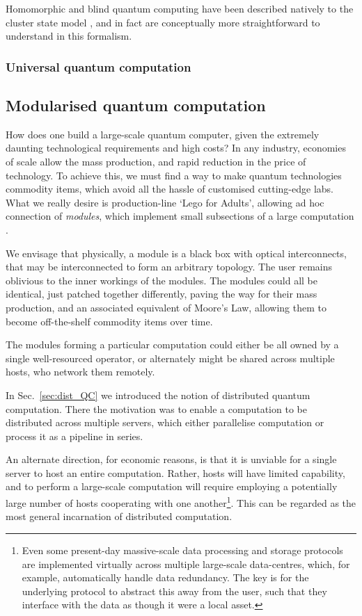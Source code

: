 \documentclass[aps,rmp,twocolumn,amsmath,amssymb,nofootinbib,superscriptaddress,longbibliography,floatfix]{revtex4-1}
\newcommand{\comment}[1]{{\color{blue}{\textbf{#1}}}}
\begin{document}
Homomorphic and blind quantum computing have been described natively to the cluster state model \cite{homoCS}, and in fact are conceptually more straightforward to understand in this formalism. 

%
%

\subsubsection{Universal quantum computation}

\comment{To do}

%
%

\subsection{Modularised quantum computation} \label{sec:module}

How does one build a large-scale quantum computer, given the extremely daunting technological requirements and high costs? In any industry, economies of scale allow the mass production, and rapid reduction in the price of technology. To achieve this, we must find a way to make quantum technologies commodity items, which avoid all the hassle of customised cutting-edge labs. What we really desire is production-line `Lego for Adults', allowing ad hoc connection of \emph{modules}, which implement small subsections of a large computation \cite{bib:FowlerPrivate}.

We envisage that physically, a module is a black box with optical interconnects, that may be interconnected to form an arbitrary topology. The user remains oblivious to the inner workings of the modules. The modules could all be identical, just patched together differently, paving the way for their mass production, and an associated equivalent of Moore's Law, allowing them to become off-the-shelf commodity items over time.

The modules forming a particular computation could either be all owned by a single well-resourced operator, or alternately might be shared across multiple hosts, who network them remotely.

In Sec.~\ref{sec:dist_QC} we introduced the notion of distributed quantum computation. There the motivation was to enable a computation to be distributed across multiple servers, which either parallelise computation or process it as a pipeline in series.

An alternate direction, for economic reasons, is that it is unviable for a single server to host an entire computation. Rather, hosts will have limited capability, and to perform a large-scale computation will require employing a potentially large number of hosts cooperating with one another\footnote{Even some present-day massive-scale data processing and storage protocols are implemented virtually across multiple large-scale data-centres, which, for example, automatically handle data redundancy. The key is for the underlying protocol to abstract this away from the user, such that they interface with the data as though it were a local asset.}. This can be regarded as the most general incarnation of distributed computation.
\end{document}

